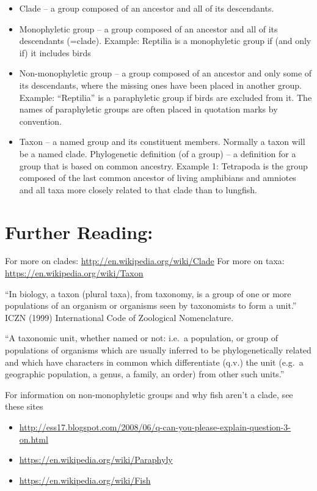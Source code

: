 \documentclass[
]{book}
\providecommand{\tightlist}{%
  \setlength{\itemsep}{0pt}\setlength{\parskip}{0pt}}
\begin{document}
\begin{itemize}
\tightlist
\item
  Clade -- a group composed of an ancestor and all of its descendants.
\item
  Monophyletic group -- a group composed of an ancestor and all of its descendants (=clade). Example: Reptilia is a monophyletic group if (and only if) it includes birds
\item
  Non-monophyletic group -- a group composed of an ancestor and only some of its descendants, where the missing ones have been placed in another group. Example: ``Reptilia'' is a paraphyletic group if birds are excluded from it. The names of paraphyletic groups are often placed in quotation marks by convention.
\item
  Taxon -- a named group and its constituent members. Normally a taxon will be a named clade. Phylogenetic definition (of a group) -- a definition for a group that is based on common ancestry. Example 1: Tetrapoda is the group composed of the last common ancestor of living amphibians and amniotes and all taxa more closely related to that clade than to lungfish.
\end{itemize}

\hypertarget{further-reading}{%
\section{Further Reading:}\label{further-reading}}

For more on clades: \url{http://en.wikipedia.org/wiki/Clade}
For more on taxa: \url{https://en.wikipedia.org/wiki/Taxon}

``In biology, a taxon (plural taxa), from taxonomy, is a group of one or more populations of an organism or organisms seen by taxonomists to form a unit.''
ICZN (1999) International Code of Zoological Nomenclature.

``A taxonomic unit, whether named or not: i.e.~a population, or group of populations of organisms which are usually inferred to be phylogenetically related and which have characters in common which differentiate (q.v.) the unit (e.g.~a geographic population, a genus, a family, an order) from other such units.''

For information on non-monophyletic groups and why fish aren't a clade, see these sites

\begin{itemize}
\tightlist
\item
  \url{http://ess17.blogspot.com/2008/06/q-can-you-please-explain-question-3-on.html}
\item
  \url{https://en.wikipedia.org/wiki/Paraphyly}
\item
  \url{https://en.wikipedia.org/wiki/Fish}
\end{itemize}
\end{document}
